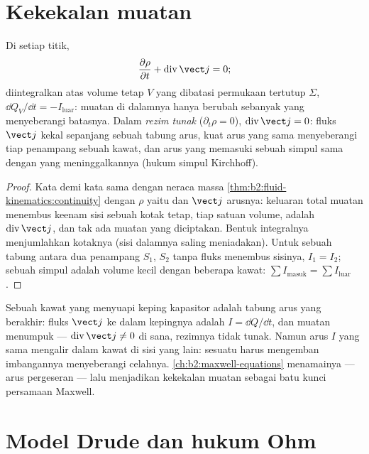 \section{Kekekalan muatan}

\begin{theorem}\label{thm:b2:charges-currents-conduction:conservation}
Di setiap titik,
\[
\frac{\partial\rho}{\partial t} + \operatorname{div}\vect j = 0 ;
\]
diintegralkan atas volume tetap $V$ yang dibatasi permukaan tertutup $\Sigma$,
$\dd Q_V/\dd t = -I_{\text{luar}}$: muatan di dalamnya hanya berubah sebanyak yang
menyeberangi batasnya. Dalam \emph{rezim tunak} ($\partial_t\rho = 0$),
$\operatorname{div}\vect j = 0$: fluks $\vect j$ kekal sepanjang sebuah tabung
arus, kuat arus yang sama menyeberangi tiap penampang sebuah kawat, dan
arus yang memasuki sebuah simpul sama dengan yang meninggalkannya (hukum simpul Kirchhoff).
\end{theorem}

\begin{proof}
Kata demi kata sama dengan neraca massa \cref{thm:b2:fluid-kinematics:continuity}
dengan $\rho$ yaitu  dan $\vect j$ arusnya: keluaran total
muatan menembus keenam sisi sebuah kotak tetap, tiap satuan volume, adalah
$\operatorname{div}\vect j$, dan tak ada muatan yang diciptakan. Bentuk integralnya menjumlahkan
kotaknya (sisi dalamnya saling meniadakan). Untuk sebuah tabung antara dua penampang
$S_1$, $S_2$ tanpa fluks menembus sisinya, $I_1 = I_2$; sebuah simpul adalah
volume kecil dengan beberapa kawat: $\sum I_{\text{masuk}} = \sum I_{\text{luar}}$.
\end{proof}

\begin{remark}\label{rem:b2:charges-currents-conduction:capacitor}
Sebuah kawat yang menyuapi keping kapasitor adalah tabung arus yang berakhir:
fluks $\vect j$ ke dalam kepingnya adalah $I = \dd Q/\dd t$, dan muatan menumpuk
--- $\operatorname{div}\vect j \ne 0$ di sana, rezimnya tidak tunak.
Namun arus $I$ yang sama mengalir dalam kawat di sisi yang lain: sesuatu
harus mengemban imbangannya menyeberangi celahnya. \cref{ch:b2:maxwell-equations}
menamainya --- arus pergeseran --- lalu menjadikan kekekalan
muatan sebagai batu kunci persamaan Maxwell.
\end{remark}

\section{Model Drude dan hukum Ohm}

